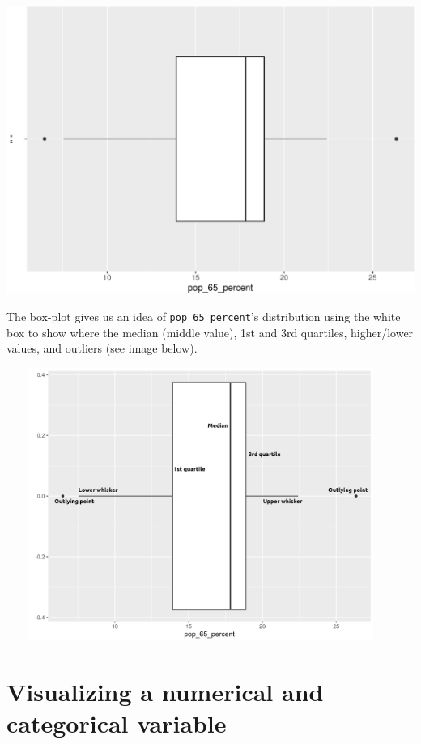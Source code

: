 \documentclass[letterpaper,12pt,twoside,]{pinp}
\begin{document}
\begin{center}\includegraphics{03-intro-to-ggplot2_files/figure-latex/Pensions-boxplot-1} \end{center}

The box-plot gives us an idea of \texttt{pop\_65\_percent}'s
distribution using the white box to show where the median (middle
value), 1st and 3rd quartiles, higher/lower values, and outliers (see
image below).

\begin{center}\includegraphics[width=5in,height=3.5in]{../img/pensions-boxplot} \end{center}

\hypertarget{visualizing-a-numerical-and-categorical-variable}{%
\section{Visualizing a numerical and categorical
variable}\label{visualizing-a-numerical-and-categorical-variable}}
\end{document}
